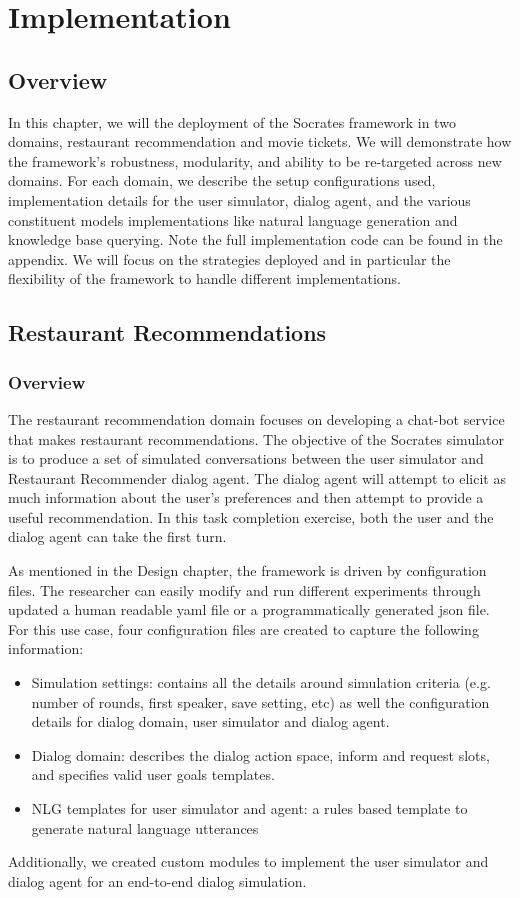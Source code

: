 
\chapter{Implementation}
\label{chap:implementation}

\section{Overview}

In this chapter, we will the deployment of the Socrates framework in two domains, restaurant recommendation and movie tickets. We will demonstrate how the framework's robustness, modularity, and ability to be re-targeted across new domains. For each domain, we describe the setup configurations used, implementation details for the user simulator, dialog agent, and the various constituent models implementations like natural language generation and knowledge base querying. Note the full implementation code can be found in the appendix. We will focus on the strategies deployed and in particular the flexibility of the framework to handle different implementations.

\section{Restaurant Recommendations}

\subsection{Overview}

The restaurant recommendation domain focuses on developing a chat-bot service that makes restaurant recommendations. The objective of the Socrates simulator is to produce a set of simulated conversations between the user simulator and Restaurant Recommender dialog agent. The dialog agent will attempt to elicit as much information about the user's preferences and then attempt to provide a useful recommendation. In this task completion exercise, both the user and the dialog agent can take the first turn. 

As mentioned in the Design chapter, the framework is driven by configuration files. The researcher can easily modify and run different experiments through updated a human readable yaml file or a programmatically generated json file. For this use case, four configuration files are created to capture the following information:
\begin{itemize}
	\item Simulation settings: contains all the details around simulation criteria (e.g. number of rounds, first speaker, save setting, etc) as well the configuration details for dialog domain, user simulator and dialog agent. 
	\item Dialog domain: describes the dialog action space, inform and request slots, and specifies valid user goals templates.
	\item NLG templates for user simulator and agent: a rules based template to generate natural language utterances 
\end{itemize}
Additionally, we created custom modules to implement the user simulator and dialog agent for an end-to-end dialog simulation. 

